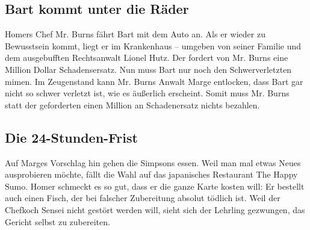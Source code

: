 	
\subsection{Bart kommt unter die Räder}\label{7F10}
Homers Chef Mr. Burns fährt Bart mit dem Auto an. Als er wieder zu Bewusstsein kommt, liegt er im Krankenhaus -- umgeben von seiner Familie und dem ausgebufften Rechtsanwalt Lionel Hutz. Der fordert von Mr. Burns eine Million Dollar Schadensersatz. Nun muss Bart nur noch den Schwerverletzten mimen. Im Zeugenstand kann Mr. Burns Anwalt Marge entlocken, dass Bart gar nicht so schwer verletzt ist, wie es äußerlich erscheint. Somit muss Mr. Burns statt der geforderten einen Million an Schadenersatz nichts bezahlen.


	
\subsection{Die 24-Stunden-Frist}\label{7F11}
Auf Marges Vorschlag hin gehen die Simpsons essen. Weil man mal etwas Neues ausprobieren möchte, fällt die Wahl auf das japanisches Restaurant \glqq The Happy Sumo\grqq . Homer schmeckt es so gut, dass er die ganze Karte kosten will: Er bestellt auch einen Fisch, der bei falscher Zubereitung absolut tödlich ist. Weil der Chefkoch Sensei nicht gestört werden will, sieht sich der Lehrling gezwungen, das Gericht selbst zu zubereiten.

